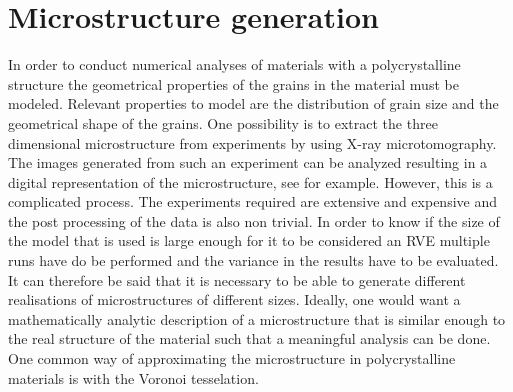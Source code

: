 \documentclass[micro_gen.tex]{subfiles}
\begin{document}
\FloatBarrier

\chapter{Microstructure generation}

In order to conduct numerical analyses of materials with a polycrystalline structure the geometrical properties of the grains in the material must be modeled. Relevant properties to model are the distribution of grain size and the geometrical shape of the grains.
One possibility is to extract the three dimensional microstructure from experiments by using X-ray microtomography. 
The images generated from such an experiment can be analyzed resulting in a digital representation of the microstructure, see for example\cite{Bhandari2007222}.
However, this is a complicated process. The experiments required are extensive and expensive and the post processing of the data is also non trivial. 
 In order to know if the size of the model that is used is large enough for it to be considered an RVE multiple runs have do be performed and the variance in the results have to be evaluated. It can therefore be said that it is necessary to be able to generate different realisations of microstructures of different sizes. Ideally, one would want a mathematically analytic description of a microstructure that is similar enough to the real structure of the material such that a meaningful analysis can be done. One common way of approximating the microstructure in polycrystalline materials is with the Voronoi tesselation. 
 
\end{document}
